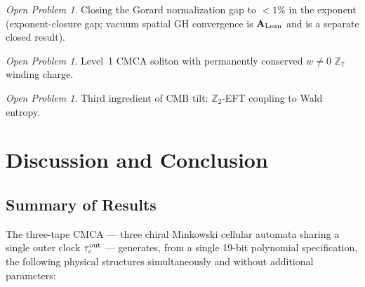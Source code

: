 \documentclass[11pt]{article}
\theoremstyle{remark}
\newtheorem{openprob}[theorem]{Open Problem}
\newcommand{\ZS}{\mathbb{Z}_7}
\newcommand{\ZZ}{\mathbb{Z}}
\newcommand{\CatAL}{\ensuremath{\textbf{A}_{\rm Lean}}}
\newcommand{\CMCA}{\text{CMCA}}
\newcommand{\taucout}{\tau_c^{\rm out}}
\begin{document}
\begin{openprob}
Closing the Gorard normalization gap to $< 1\%$ in the exponent
(exponent-closure gap; vacuum spatial GH convergence is \CatAL{} and is a separate
closed result).
\end{openprob}

\begin{openprob}
Level~1 $\CMCA$ soliton with permanently conserved $w \neq 0$ $\ZS$
winding charge.
\end{openprob}

\begin{openprob}
Third ingredient of CMB tilt: $\ZZ_2$-EFT coupling to Wald entropy.
\end{openprob}

\FloatBarrier

\section{Discussion and Conclusion}
\label{sec:conclusion}

\subsection{Summary of Results}

The three-tape $\CMCA$ — three chiral Minkowski cellular automata sharing
a single outer clock $\taucout$ — generates, from a single 19-bit
polynomial specification, the following physical structures simultaneously
and without additional parameters:
\end{document}
